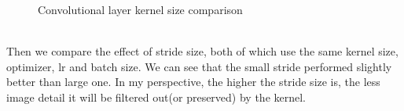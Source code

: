 \documentclass[11pt, a4paper]{article} %
\begin{document}
\begin{figure}[H]
  \centering
  \hfill
  \caption{Convolutional layer kernel size comparison}
\end{figure}
\\ Then we compare the effect of stride size, both of which use the same kernel size, optimizer, lr and batch size.
We can see that the small stride performed slightly better than large one. In my perspective, the higher the stride size is, the less image detail it will be filtered out(or preserved) by the kernel. 
\end{document}
